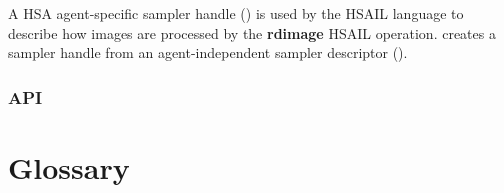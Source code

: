 \documentclass[final,oneside]{book}
\newcommand{\reffun}[1]{\textbf{#1}}
\newcommand{\refhsl}[1]{\reffun{#1}}
\begin{document}
A HSA agent-specific sampler handle () is used
by the HSAIL language to describe how images are processed by the
\refhsl{rdimage} HSAIL operation.  creates
a sampler handle from an agent-independent sampler descriptor
().

\subsection{API}




\appendix
\chapter{Glossary}
\end{document}
